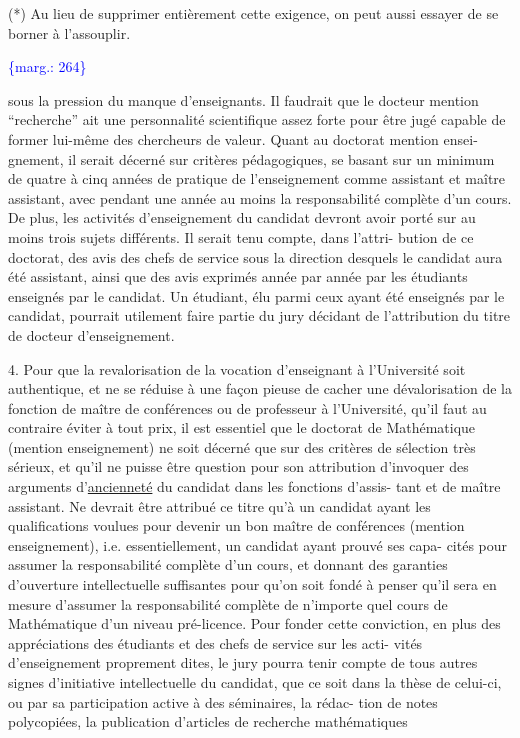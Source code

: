 \documentclass[11pt]{article}
\newcommand{\scanpage}[1]{\par\bigskip\noindent{\small\sffamily[scan #1]}\par}
\newcommand{\mspage}[1]{{\small\sffamily[p.\,#1]}}
\newcommand{\margin}[1]{\textcolor{blue}{\{\textsf{marg.:} #1\}}}
\newcommand{\uline}[1]{\underline{#1}}
\begin{document}
(*) Au lieu de supprimer entièrement cette exigence, on peut aussi essayer de
se borner à l'assouplir.

\margin{264}

\clearpage
\scanpage{119/265}
\mspage{12}

sous la pression du manque d'enseignants. Il faudrait que le docteur mention
``recherche'' ait une personnalité scientifique assez forte pour être jugé capable
de former lui-même des chercheurs de valeur. Quant au doctorat mention ensei-%
gnement, il serait décerné sur critères pédagogiques, se basant sur un minimum
de quatre à cinq années de pratique de l'enseignement comme assistant et maître
assistant, avec pendant une année au moins la responsabilité complète d'un
cours. De plus, les activités d'enseignement du candidat devront avoir porté
sur au moins trois sujets différents. Il serait tenu compte, dans l'attri-%
bution de ce doctorat, des avis des chefs de service sous la direction desquels
le candidat aura été assistant, ainsi que des avis exprimés année par année par
les étudiants enseignés par le candidat. Un étudiant, élu parmi ceux ayant été
enseignés par le candidat, pourrait utilement faire partie du jury décidant de
l'attribution du titre de docteur d'enseignement.

4. Pour que la revalorisation de la vocation d'enseignant à l'Université soit
authentique, et ne se réduise à une façon pieuse de cacher une dévalorisation
de la fonction de maître de conférences ou de professeur à l'Université, qu'il
faut au contraire éviter à tout prix, il est essentiel que le doctorat de
Mathématique (mention enseignement) ne soit décerné que sur des critères de
sélection très sérieux, et qu'il ne puisse être question pour son attribution
d'invoquer des arguments d'\uline{ancienneté} du candidat dans les fonctions d'assis-%
tant et de maître assistant. Ne devrait être attribué ce titre qu'à un candidat
ayant les qualifications voulues pour devenir un bon maître de conférences
(mention enseignement), i.e. essentiellement, un candidat ayant prouvé ses capa-%
cités pour assumer la responsabilité complète d'un cours, et donnant des
garanties d'ouverture intellectuelle suffisantes pour qu'on soit fondé à penser
qu'il sera en mesure d'assumer la responsabilité complète de n'importe quel
cours de Mathématique d'un niveau pré-licence. Pour fonder cette conviction,
en plus des appréciations des étudiants et des chefs de service sur les acti-%
vités d'enseignement proprement dites, le jury pourra tenir compte de tous
autres signes d'initiative intellectuelle du candidat, que ce soit dans la
thèse de celui-ci, ou par sa participation active à des séminaires, la rédac-%
tion de notes polycopiées, la publication d'articles de recherche mathématiques
\end{document}
